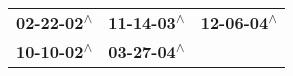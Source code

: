 \begin{supertabular}{lll}
 \textbf{02-22-02\textsuperscript{$\wedge$}} &  \textbf{11-14-03\textsuperscript{$\wedge$}} &  \textbf{12-06-04\textsuperscript{$\wedge$}} \\
 \textbf{10-10-02\textsuperscript{$\wedge$}} &  \textbf{03-27-04\textsuperscript{$\wedge$}} &                                              \\
\end{supertabular}
